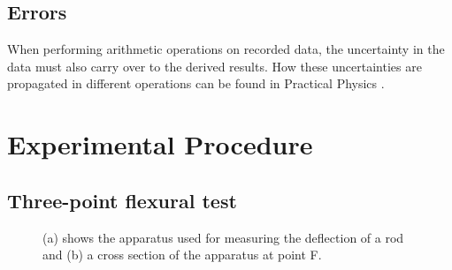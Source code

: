 \documentclass[11pt,a4paper]{article}
\begin{document}
  \subsection{Errors}
    When performing arithmetic operations on recorded data, the uncertainty in the data must also carry over to the derived results. How these uncertainties are propagated in different operations can be found in Practical Physics \cite{squires}.

\section{\label{section:experimental}Experimental Procedure}
  \subsection{Three-point flexural test}

    \begin{figure}[H]
      \centering
      \center
      \caption{(a) shows the apparatus used for measuring the deflection of a rod and (b) a cross section of the  apparatus at point F.}
      \label{fig:exp_1}
    \end{figure}
\end{document}
